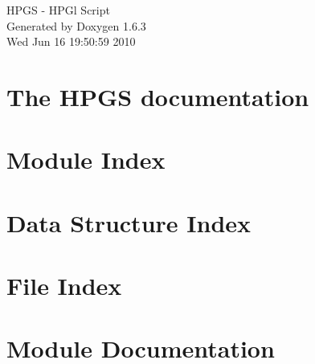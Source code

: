 \documentclass[a4paper]{book}
\begin{document}
\begin{titlepage}
\vspace*{7cm}
\begin{center}
{\Large HPGS -\/ HPGl Script }\\
\vspace*{1cm}
{\large Generated by Doxygen 1.6.3}\\
\vspace*{0.5cm}
{\small Wed Jun 16 19:50:59 2010}\\
\end{center}
\end{titlepage}
\clearemptydoublepage
{}
\tableofcontents
\clearemptydoublepage
{}
\chapter{The HPGS documentation}
\label{index}
\chapter{Module Index}

\chapter{Data Structure Index}

\chapter{File Index}

\chapter{Module Documentation}








\end{document}
